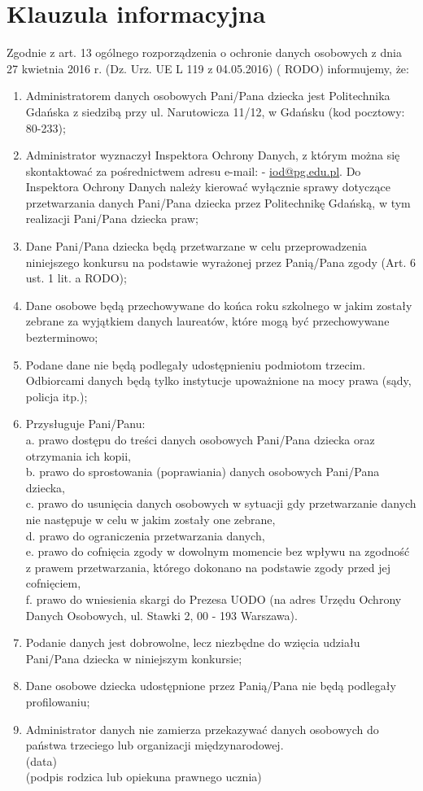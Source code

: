 \documentclass[10pt]{article}
\begin{document}
\section*{Klauzula informacyjna}
Zgodnie z art. 13 ogólnego rozporządzenia o ochronie danych osobowych z dnia 27 kwietnia 2016 r. (Dz. Urz. UE L 119 z 04.05.2016) ( RODO) informujemy, że:

\begin{enumerate}
  \item Administratorem danych osobowych Pani/Pana dziecka jest Politechnika Gdańska z siedzibą przy ul. Narutowicza 11/12, w Gdańsku (kod pocztowy: 80-233);
  \item Administrator wyznaczył Inspektora Ochrony Danych, z którym można się skontaktować za pośrednictwem adresu e-mail: - \href{mailto:iod@pg.edu.pl}{iod@pg.edu.pl}. Do Inspektora Ochrony Danych należy kierować wyłącznie sprawy dotyczące przetwarzania danych Pani/Pana dziecka przez Politechnikę Gdańską, w tym realizacji Pani/Pana dziecka praw;
  \item Dane Pani/Pana dziecka będą przetwarzane w celu przeprowadzenia niniejszego konkursu na podstawie wyrażonej przez Panią/Pana zgody (Art. 6 ust. 1 lit. a RODO);
  \item Dane osobowe będą przechowywane do końca roku szkolnego w jakim zostały zebrane za wyjątkiem danych laureatów, które mogą być przechowywane bezterminowo;
  \item Podane dane nie będą podlegały udostępnieniu podmiotom trzecim. Odbiorcami danych będą tylko instytucje upoważnione na mocy prawa (sądy, policja itp.);
  \item Przysługuje Pani/Panu:\\
a. prawo dostępu do treści danych osobowych Pani/Pana dziecka oraz otrzymania ich kopii,\\
b. prawo do sprostowania (poprawiania) danych osobowych Pani/Pana dziecka,\\
c. prawo do usunięcia danych osobowych w sytuacji gdy przetwarzanie danych nie następuje w celu w jakim zostały one zebrane,\\
d. prawo do ograniczenia przetwarzania danych,\\
e. prawo do cofnięcia zgody w dowolnym momencie bez wpływu na zgodność z prawem przetwarzania, którego dokonano na podstawie zgody przed jej cofnięciem,\\
f. prawo do wniesienia skargi do Prezesa UODO (na adres Urzędu Ochrony Danych Osobowych, ul. Stawki 2, 00 - 193 Warszawa).
  \item Podanie danych jest dobrowolne, lecz niezbędne do wzięcia udziału Pani/Pana dziecka w niniejszym konkursie;
  \item Dane osobowe dziecka udostępnione przez Panią/Pana nie będą podlegały profilowaniu;
  \item Administrator danych nie zamierza przekazywać danych osobowych do państwa trzeciego lub organizacji międzynarodowej.\\
(data)\\
(podpis rodzica lub opiekuna prawnego ucznia)
\end{enumerate}
\end{document}
